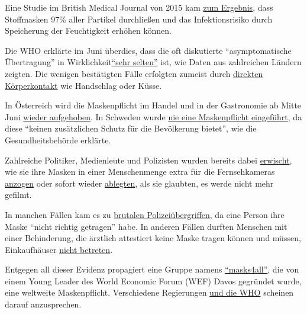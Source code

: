 Eine Studie im British Medical Journal von 2015 kam
\href{https://bmjopen.bmj.com/content/5/4/e006577}{zum Ergebnis}, dass
Stoffmasken 97\% aller Partikel durchließen und das Infektionsrisiko
durch Speicherung der Feuchtigkeit erhöhen können.

Die WHO erklärte im Juni überdies, dass die oft diskutierte
``asymptomatische Übertragung'' in
Wirklichkeit\href{https://www.nationalreview.com/news/who-says-transmission-by-asymptomatic-covid-patients-very-rare/}{``sehr
selten''} ist, wie Daten aus zahlreichen Ländern zeigten. Die wenigen
bestätigten Fälle erfolgten zumeist durch
\href{https://wwwnc.cdc.gov/eid/article/26/8/20-1235_article}{direkten
Körperkontakt} wie Handschlag oder Küsse.

In Österreich wird die Maskenpflicht im Handel und in der Gastronomie ab
Mitte Juni
\href{https://www.derstandard.at/story/2000117792769/die-maske-wird-wieder-zurueckgedraengt}{wieder
aufgehoben}. In Schweden wurde
\href{https://www.thelocal.se/20200514/explained-why-is-sweden-not-recommending-face-masks-to-the-public}{nie
eine Maskenpflicht eingeführt}, da diese ``keinen zusätzlichen Schutz
für die Bevölkerung bietet'', wie die Gesundheitsbehörde erklärte.

Zahlreiche Politiker, Medienleute und Polizisten wurden bereits dabei
\href{https://www.youtube.com/watch?v=y2qAKS6Hl4I}{erwischt}, wie sie
ihre Masken in einer Menschenmenge extra für die Fernsehkameras
\href{https://twitter.com/DailyCaller/status/1265382872631980032}{anzogen}
oder sofort wieder
\href{https://twitter.com/realPowerTie/status/1261445611594723330}{ablegten},
als sie glaubten, es werde nicht mehr gefilmt.

In manchen Fällen kam es zu
\href{https://twitter.com/DrRJKavanagh/status/1260739779177656325}{brutalen
Polizeiübergriffen}, da eine Person ihre Maske ``nicht richtig
getragen'' habe. In anderen Fällen durften Menschen mit einer
Behinderung, die ärztlich attestiert keine Maske tragen können und
müssen, Einkaufhäuser
\href{https://bnn.de/lokales/karlsruhe/maskenpflicht-behinderte-sind-befreit-und-werden-dafuer-teils-beschimpft}{nicht
betreten}.

Entgegen all dieser Evidenz propagiert eine Gruppe namens
\href{https://masks4all.co/about-us/}{``masks4all''}, die von einem
Young Leader des World Economic Forum (WEF) Davos gegründet wurde, eine
weltweite Maskenpflicht. Verschiedene Regierungen
\href{https://www.businessinsider.com/who-updates-face-masks-recommendations-amid-the-coronavirus-pandemic-2020-6}{und
die WHO} scheinen darauf anzusprechen.

